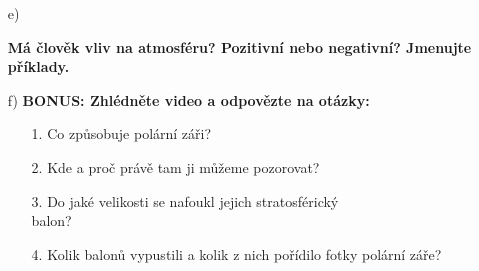 \documentclass[11pt]{article}
\begin{document}
\begin{enumerate}
 
\item[e)]

\textbf{Má člověk vliv na atmosféru? Pozitivní nebo negativní? Jmenujte příklady.}

\bigskip
\bigskip
\bigskip

\item[f)] \textbf{BONUS: Zhlédněte video a odpovězte na otázky:}


\begin{minipage}{0.6\textwidth}
    
  \begin{enumerate}[label=(\Alph), itemsep=0pt]
  \item[1.] Co způsobuje polární záři?
  \bigskip
  \item[2.] Kde a proč právě tam ji můžeme pozorovat?
  \bigskip
  \item[3.] Do jaké velikosti se nafoukl jejich stratosférický\\ balon?
  \bigskip
  \item[4.] Kolik balonů vypustili a kolik z nich pořídilo fotky polární záře?
    \end{enumerate}
  

\end{minipage}
\end{enumerate}
\end{document}
